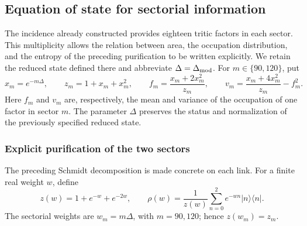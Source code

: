 \subsection{Equation of state for sectorial information}
\label{v:ant:sec:ii-ecuacion-informacion}

The incidence already constructed provides eighteen tritic factors in
each sector. This multiplicity allows the relation between area,
the occupation distribution, and the entropy of the preceding
purification to be written explicitly. We retain the reduced state defined there
and abbreviate $\Delta=\Delta_{\rm mod}$. For $m\in\{90,120\}$, put
\begin{equation}
 x_m=e^{-m\Delta},\qquad z_m=1+x_m+x_m^2,\qquad
 f_m=\frac{x_m+2x_m^2}{z_m},\qquad
 v_m=\frac{x_m+4x_m^2}{z_m}-f_m^2.
 \label{v:ant:eq:ii-sector-momentos}
\end{equation}
Here $f_m$ and $v_m$ are, respectively, the mean and variance of
the occupation of one factor in sector $m$. The parameter $\Delta$ preserves
the status and normalization of the previously specified reduced
state.

\subsubsection{Explicit purification of the two sectors}
\label{v:ant:sec:ii-area-purificacion-producto}

The preceding Schmidt decomposition is made concrete on each link.
For a finite real weight \(w\), define
\[
 z(w)=1+e^{-w}+e^{-2w},\qquad
 \rho(w)=\frac1{z(w)}\sum_{n=0}^2e^{-wn}|n\rangle\langle n|.
\]
The sectorial weights are \(w_m=m\Delta\), with \(m=90,120\);
hence \(z(w_m)=z_m\).

